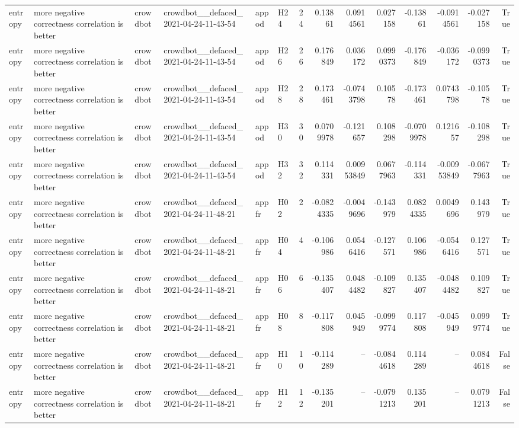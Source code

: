 \begin{longtable}{llllllrrrrrrrr}
entropy & more negative correctness correlation is better & crowdbot & crowdbot\_\_defaced\_2021-04-24-11-43-54 & appod & H24 & 24 & 0.13861 & 0.0914561 & 0.027158 & -0.13861 & -0.0914561 & -0.027158 & True \\
entropy & more negative correctness correlation is better & crowdbot & crowdbot\_\_defaced\_2021-04-24-11-43-54 & appod & H26 & 26 & 0.176849 & 0.036172 & 0.0990373 & -0.176849 & -0.036172 & -0.0990373 & True \\
entropy & more negative correctness correlation is better & crowdbot & crowdbot\_\_defaced\_2021-04-24-11-43-54 & appod & H28 & 28 & 0.173461 & -0.0743798 & 0.10578 & -0.173461 & 0.0743798 & -0.10578 & True \\
entropy & more negative correctness correlation is better & crowdbot & crowdbot\_\_defaced\_2021-04-24-11-43-54 & appod & H30 & 30 & 0.0709978 & -0.121657 & 0.108298 & -0.0709978 & 0.121657 & -0.108298 & True \\
entropy & more negative correctness correlation is better & crowdbot & crowdbot\_\_defaced\_2021-04-24-11-43-54 & appod & H32 & 32 & 0.114331 & 0.00953849 & 0.0677963 & -0.114331 & -0.00953849 & -0.0677963 & True \\
entropy & more negative correctness correlation is better & crowdbot & crowdbot\_\_defaced\_2021-04-24-11-48-21 & appfr & H02 & 2 & -0.0824335 & -0.0049696 & -0.143979 & 0.0824335 & 0.0049696 & 0.143979 & True \\
entropy & more negative correctness correlation is better & crowdbot & crowdbot\_\_defaced\_2021-04-24-11-48-21 & appfr & H04 & 4 & -0.106986 & 0.0546416 & -0.127571 & 0.106986 & -0.0546416 & 0.127571 & True \\
entropy & more negative correctness correlation is better & crowdbot & crowdbot\_\_defaced\_2021-04-24-11-48-21 & appfr & H06 & 6 & -0.135407 & 0.0484482 & -0.109827 & 0.135407 & -0.0484482 & 0.109827 & True \\
entropy & more negative correctness correlation is better & crowdbot & crowdbot\_\_defaced\_2021-04-24-11-48-21 & appfr & H08 & 8 & -0.117808 & 0.045949 & -0.0999774 & 0.117808 & -0.045949 & 0.0999774 & True \\
entropy & more negative correctness correlation is better & crowdbot & crowdbot\_\_defaced\_2021-04-24-11-48-21 & appfr & H10 & 10 & -0.114289 & -- & -0.0844618 & 0.114289 & -- & 0.0844618 & False \\
entropy & more negative correctness correlation is better & crowdbot & crowdbot\_\_defaced\_2021-04-24-11-48-21 & appfr & H12 & 12 & -0.135201 & -- & -0.0791213 & 0.135201 & -- & 0.0791213 & False \\

\end{longtable}
